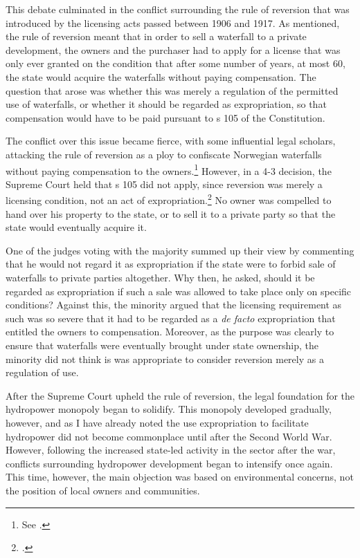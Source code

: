 This debate culminated in the conflict surrounding the rule of reversion that was introduced by the licensing acts passed between 1906 and 1917. As mentioned, the rule of reversion meant that in order to sell a waterfall to a private development, the owners and the purchaser had to apply for a license that was only ever granted on the condition that after some number of years, at most 60, the state would acquire the waterfalls without paying compensation. The question that arose was whether this was merely a regulation of the permitted use of waterfalls, or whether it should be regarded as expropriation, so that compensation would have to be paid pursuant to s 105 of the Constitution.

The conflict over this issue became fierce, with some influential legal scholars, attacking the rule of reversion as a ploy to confiscate Norwegian waterfalls without paying compensation to the owners.\footnote{See \cite{morgenstierne14}.} However, in a 4-3 decision, the Supreme Court held that s 105 did not apply, since reversion was merely a licensing condition, not an act of expropriation.\footcite{johansen18} No owner was compelled to hand over his property to the state, or to sell it to a private party so that the state would eventually acquire it.

One of the judges voting with the majority summed up their view by commenting that he would not regard it as expropriation if the state were to forbid sale of waterfalls to private parties altogether. Why then, he asked, should it be regarded as expropriation if such a sale was allowed to take place only on specific conditions? Against this, the minority argued that the licensing requirement as such was so severe that it had to be regarded as a {\it de facto} expropriation that entitled the owners to compensation. Moreover, as the purpose was clearly to ensure that waterfalls were eventually brought under state ownership, the minority did not think is was appropriate to consider reversion merely as a regulation of use.

After the Supreme Court upheld the rule of reversion, the legal foundation for the hydropower monopoly began to solidify. This monopoly developed gradually, however, and as I have already noted the use expropriation to facilitate hydropower did not become commonplace until after the Second World War. However, following the increased state-led activity in the sector after the war, conflicts surrounding hydropower development began to intensify once again. This time, however, the main objection was based on environmental concerns, not the position of local owners and communities.

